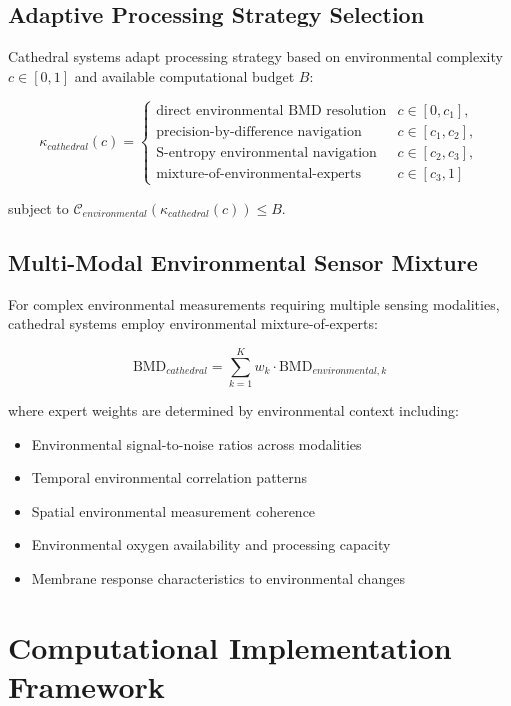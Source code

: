 \documentclass[12pt,a4paper]{article}
\begin{document}
\subsection{Adaptive Processing Strategy Selection}

Cathedral systems adapt processing strategy based on environmental complexity $c \in [0,1]$ and available computational budget $B$:

\begin{equation}
\kappa_{cathedral}(c) = \begin{cases}
\text{direct environmental BMD resolution} & c \in [0, c_1], \\
\text{precision-by-difference navigation} & c \in [c_1, c_2], \\
\text{S-entropy environmental navigation} & c \in [c_2, c_3], \\
\text{mixture-of-environmental-experts} & c \in [c_3, 1]
\end{cases}
\end{equation}

subject to $\mathcal{C}_{environmental}(\kappa_{cathedral}(c)) \leq B$.

\subsection{Multi-Modal Environmental Sensor Mixture}

For complex environmental measurements requiring multiple sensing modalities, cathedral systems employ environmental mixture-of-experts:

\begin{equation}
\text{BMD}_{cathedral} = \sum_{k=1}^{K} w_k \cdot \text{BMD}_{environmental,k}
\end{equation}

where expert weights are determined by environmental context including:
\begin{itemize}
\item Environmental signal-to-noise ratios across modalities
\item Temporal environmental correlation patterns
\item Spatial environmental measurement coherence
\item Environmental oxygen availability and processing capacity
\item Membrane response characteristics to environmental changes
\end{itemize}

\section{Computational Implementation Framework}
\end{document}
